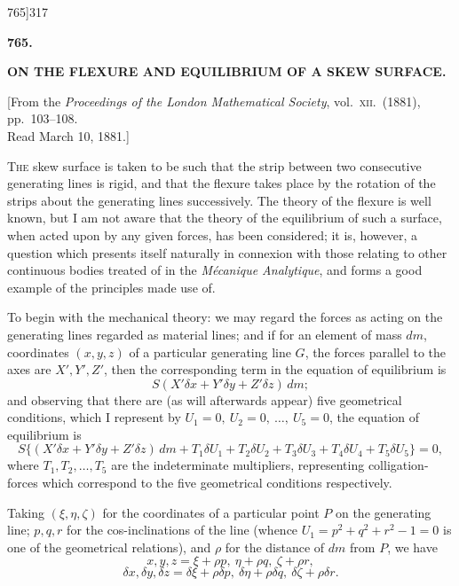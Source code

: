 \documentclass[11pt]{article}
\begin{document}
\begin{center}
{\small 765]\hfill\hfill 317}
\end{center}

\begin{center}\textbf{765.}\end{center}

\begin{center}\textbf{ON THE FLEXURE AND EQUILIBRIUM OF A SKEW SURFACE.}\end{center}

\begin{center}\small [From the \textit{Proceedings of the London Mathematical Society}, vol.\ \textsc{xii}.\ (1881), pp.\ 103--108.\\
Read March 10, 1881.]\end{center}

\textsc{The} skew surface is taken to be such that the strip between two consecutive
generating lines is rigid, and that the flexure takes place by the rotation of the
strips about the generating lines successively. The theory of the flexure is well known,
but I am not aware that the theory of the equilibrium of such a surface, when acted
upon by any given forces, has been considered; it is, however, a question which
presents itself naturally in connexion with those relating to other continuous bodies
treated of in the \textit{M\'ecanique Analytique}, and forms a good example of the principles
made use of.

To begin with the mechanical theory: we may regard the forces as acting on
the generating lines regarded as material lines; and if for an element of mass $dm$,
coordinates $(x, y, z)$ of a particular generating line $G$, the forces parallel to the axes
are $X', Y', Z'$, then the corresponding term in the equation of equilibrium is
\[
S(X'\delta x + Y'\delta y + Z'\delta z)\,dm;
\]
and observing that there are (as will afterwards appear) five geometrical conditions, which
I represent by $U_1 = 0,\ U_2 = 0,\ \ldots,\ U_5 = 0$, the equation of equilibrium is
\[
S\{(X'\delta x + Y'\delta y + Z'\delta z)\,dm + T_1\delta U_1 + T_2\delta U_2 + T_3\delta U_3 + T_4\delta U_4 + T_5\delta U_5\} = 0,
\]
where $T_1, T_2, \ldots, T_5$ are the indeterminate multipliers, representing colligation-forces
which correspond to the five geometrical conditions respectively.

Taking $(\xi, \eta, \zeta)$ for the coordinates of a particular point $P$ on the generating
line; $p, q, r$ for the cos-inclinations of the line (whence $U_1 = p^2 + q^2 + r^2 - 1 = 0$ is one
of the geometrical relations), and $\rho$ for the distance of $dm$ from $P$, we have
\[
x, y, z = \xi + \rho p,\ \eta + \rho q,\ \zeta + \rho r,
\]
\[
\delta x, \delta y, \delta z = \delta\xi + \rho\delta p,\ \delta\eta + \rho\delta q,\ \delta\zeta + \rho\delta r.
\]
\end{document}
